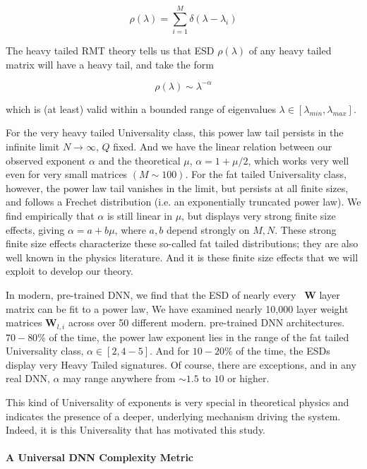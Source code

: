 $$\rho(\lambda)=\sum\limits_{i=1}^{M}\delta(\lambda-\lambda_{i})$$

The heavy tailed RMT theory tells us that ESD  $\rho(\lambda)$ of any heavy tailed matrix will have a heavy tail, and take the form

$$\rho(\lambda)\sim\lambda^{-\alpha}$$

which is (at least) valid within a bounded range of eigenvalues $\lambda\in[\lambda_{min},\lambda_{max}]$.  

For the very heavy tailed Universality class, this power law tail persists in the infinite limit $N\rightarrow\infty$, $Q$ fixed.
And we have the linear relation between our observed exponent $\alpha$ and the theoretical $\mu$,  $\alpha=1+\mu/2$,
which works very well even for very small matrices $(M\sim100)$.
For the fat tailed Universality class, however, the power law tail vanishes in the limit, but persists at all finite sizes, and
follows a Frechet distribution (i.e. an exponentially truncated power law).  We find empirically that $\alpha$ is still
linear in $\mu$, but displays very strong finite size effects, giving $\alpha=a+b\mu$, where $a,b$ depend strongly on $M,N$.
These strong finite size effects characterize these so-called fat tailed distributions; they are also well known in the physics
literature\cite{sornette}. And it is these finite size effects that we will exploit to develop our theory.

In modern, pre-trained DNN, we find that the ESD of nearly every \ $\mathbf{W}$ layer matrix can be fit to a power law,
We have examined nearly 10,000 layer weight matrices $\mathbf{W}_{l,i}$ across over 50 different modern. pre-trained DNN architectures.  
 $70-80\%$ of the time, the power law exponent lies in the range of the fat tailed Universality class, $\alpha\in[2,4-5]$.
And for $10-20\%$ of the time, the ESDs display very Heavy Tailed signatures.
Of course, there are exceptions, and in any real DNN,  $\alpha$ may range anywhere from $\sim1.5$ to $10$ or higher.  

This kind of Universality of exponents is very special in theoretical physics and indicates the presence of a deeper, 
underlying mechanism driving the system.  Indeed, it is this Universality that has motivated this study.

\paragraph{A Universal DNN Complexity Metric}

